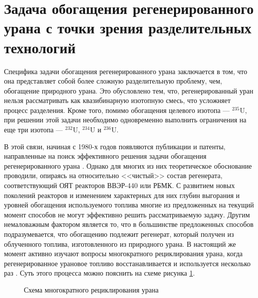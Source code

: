 
\section{Задача обогащения регенерированного урана с точки зрения разделительных технологий}

Специфика задачи обогащения регенерированного урана заключается в том, что она представляет собой более сложную разделительную проблему, чем, обогащение  природного урана.
Это обусловлено тем, что, регенерированный уран нельзя рассматривать как квазибинарную изотопную смесь, что усложняет процесс разделения. Кроме того, помимо обогащения целевого изотопа --- $^{235}$U, при решении этой задачи необходимо одновременно выполнить ограничения на еще три изотопа --- $^{232}$U, $^{234}$U и $^{236}$U.

В этой связи, начиная с 1980-х годов появляются публикации и патенты, направленные на поиск эффективного решения задачи обогащения регенерированного урана \cite{ksenof88,borodynyaIssledovanieProblemyVovlecheniya1989,smirnovKaskadnyeShemyZadachah2012,sulaberidzeNekotoryhRazdelitelnyhProblemah2004,kazukihidaSimultaneousEvaluationEffects1986,sidenkoIssledovanieKaskadnyhShem,smirnovObogashchenieRegenerirovannogoUrana2018,prusakovKorrekciyaIzotopnogoSostava2008}. Однако для многих из них теоретическое обоснование проводили, опираясь на относительно <<чистый>> состав регенерата, соответствующий ОЯТ реакторов ВВЭР-440 или РБМК. С развитием новых поколений реакторов и изменением характерных для них глубин выгорания и уровней обогащения используемого топлива многие из предложенных на текущий момент способов не могут эффективно решить рассматриваемую задачу.
Другим немаловажным фактором является то, что в большинстве предложенных способов подразумевается, что обогащению подлежит регенерат, который получен из облученного топлива, изготовленного из природного урана. В настоящий же момент активно изучают вопросы многократного рециклирования урана, когда регенерированное урановое топливо восстанавливается и используется несколько раз \cite{rodionovaAnalizTehnikoekonomicheskihHarakteristik2019,smirnovFizikotehnicheskieProblemyObogashcheniya2020}. Суть этого процесса можно пояснить на схеме рисунка \ref{recycle}.

\begin{figure}[ht]
  \caption{Схема многократного рециклирования урана}\label{recycle}
\end{figure}

